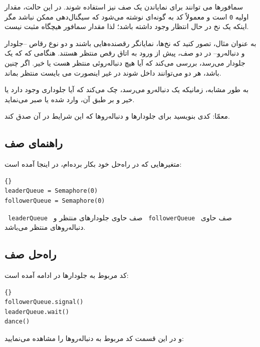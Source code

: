 \documentclass{book}
\newcommand{\clearemptydoublepage}{}%
\begin{document}
    سمافور‌ها می توانند برای نمایاندن یک صف نیز استفاده شوند. 
    در این حالت، مقدار اولیه \texttt{0} است
    و معمولاً کد به گونه‌ای  نوشته می‌شود که سیگنال‌دهی ممکن نباشد 
    مگر اینکه یک نخ در حال انتظار وجود داشته باشد؛ لذا مقدار سمافور هیچگاه مثبت نیست.

    به عنوان مثال، تصور کنید که نخ‌ها، نمایانگر رقصنده‌هایی باشند و دو نوع رقاص --جلودار و  دنباله‌رو--
    در دو صف، پیش از ورود به اتاق رقص منتظر هستند. 
    هنگامی که که یک جلودار می‌رسد، بررسی می‌کند که آیا هیچ دنباله‌روئی منتظر هست یا خیر. 
    اگر چنین باشد، هر دو می‌توانند داخل شوند در غیر اینصورت می بایست منتظر بماند.

    به طور مشابه، زمانیکه یک دنباله‌رو می‌رسد، چک می‌کند که آیا جلوداری وجود دارد یا خیر و بر طبق آن،  وارد شده یا صبر می‌نماید. 

    معمّا:  کدی بنویسید برای جلو‌دارها و دنباله‌رو‌ها که این شرایط در آن صدق کند.


\clearemptydoublepage
\subsection {راهنمای صف}

    متغیرهایی که در راه‌حل خود بکار برده‌ام، در اینجا آمده است:

\begin{latin}
\begin{lstlisting}[title=\rl{راهنمای صف}]{}
leaderQueue = Semaphore(0)
followerQueue = Semaphore(0)
\end{lstlisting}
\end{latin}

\texttt{ leaderQueue }     صف حاوی جلو‌دارهای منتظر و
\texttt{  followerQueue } صف حاوی دنباله‌رو‌های منتظر می‌باشد.



\clearemptydoublepage
\subsection {راه‌حل صف}

    کد مربوط به جلو‌دارها در ادامه آمده است:

\begin{latin}
\begin{lstlisting}[title=\rl{راه‌حل صف (جلودارها)}]{}
followerQueue.signal()
leaderQueue.wait()
dance()
\end{lstlisting}
\end{latin}

    و در این قسمت کد مربوط به دنباله‌روها را مشاهده می‌نمایید:
\end{document}
